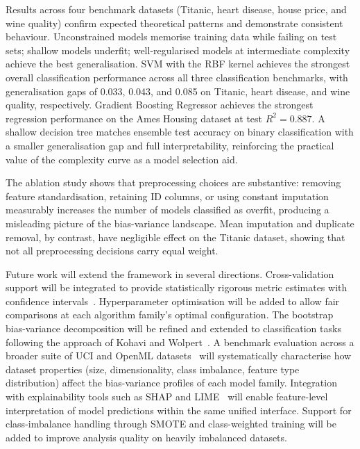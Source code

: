 \documentclass[conference]{IEEEtran}
\begin{document}
Results across four benchmark datasets (Titanic, heart disease, house price, and wine quality) confirm expected theoretical patterns and demonstrate consistent behaviour. Unconstrained models memorise training data while failing on test sets; shallow models underfit; well-regularised models at intermediate complexity achieve the best generalisation. SVM with the RBF kernel achieves the strongest overall classification performance across all three classification benchmarks, with generalisation gaps of 0.033, 0.043, and 0.085 on Titanic, heart disease, and wine quality, respectively. Gradient Boosting Regressor achieves the strongest regression performance on the Ames Housing dataset at test $R^2 = 0.887$. A shallow decision tree matches ensemble test accuracy on binary classification with a smaller generalisation gap and full interpretability, reinforcing the practical value of the complexity curve as a model selection aid.

The ablation study shows that preprocessing choices are substantive: removing feature standardisation, retaining ID columns, or using constant imputation measurably increases the number of models classified as overfit, producing a misleading picture of the bias-variance landscape. Mean imputation and duplicate removal, by contrast, have negligible effect on the Titanic dataset, showing that not all preprocessing decisions carry equal weight.

Future work will extend the framework in several directions. Cross-validation support will be integrated to provide statistically rigorous metric estimates with confidence intervals~\cite{b39}. Hyperparameter optimisation will be added to allow fair comparisons at each algorithm family's optimal configuration. The bootstrap bias-variance decomposition will be refined and extended to classification tasks following the approach of Kohavi and Wolpert~\cite{b40}. A benchmark evaluation across a broader suite of UCI and OpenML datasets~\cite{b41} will systematically characterise how dataset properties (size, dimensionality, class imbalance, feature type distribution) affect the bias-variance profiles of each model family. Integration with explainability tools such as SHAP and LIME~\cite{b42} will enable feature-level interpretation of model predictions within the same unified interface. Support for class-imbalance handling through SMOTE and class-weighted training will be added to improve analysis quality on heavily imbalanced datasets.
\end{document}
